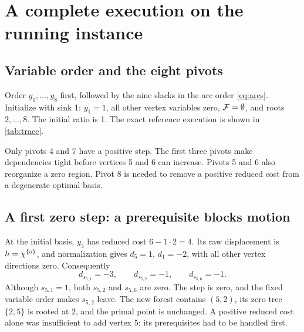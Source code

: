 \section{A complete execution on the running instance}\label{sec:trace}

\subsection{Variable order and the eight pivots}
Order $y_1,\ldots,y_8$ first, followed by the nine slacks in the arc order
\eqref{eq:arcs}. Initialize with sink 1: $y_1=1$, all other vertex variables
zero, $\mathcal F=\emptyset$, and roots $2,\ldots,8$. The initial ratio is 1.
The exact reference execution is shown in \cref{tab:trace}.

\begin{table}[htbp]
\renewcommand{\arraystretch}{1.4}
\centering
\caption{Complete Bland-rule trace for the first ratio oracle. Each row is
checked against a separately assembled rational basis system.}\label{tab:trace}
\end{table}

Only pivots 4 and 7 have a positive step. The first three pivots make
dependencies tight before vertices 5 and 6 can increase. Pivots 5 and 6
also reorganize a zero region. Pivot 8 is needed to remove a positive
reduced cost from a degenerate optimal basis.

\subsection{A first zero step: a prerequisite blocks motion}
At the initial basis, $y_5$ has reduced cost $6-1\cdot2=4$.
Its raw displacement is $h=\chi^{\{5\}}$, and normalization gives
$d_5=1$, $d_1=-2$, with all other vertex directions zero. Consequently
\[
 d_{s_{5,1}}=-3,\qquad d_{s_{5,2}}=-1,\qquad d_{s_{5,6}}=-1.
\]
Although $s_{5,1}=1$, both $s_{5,2}$ and $s_{5,6}$ are zero. The step is
zero, and the fixed variable order makes $s_{5,2}$ leave. The new forest
contains $(5,2)$, its zero tree $\{2,5\}$ is rooted at 2, and the primal
point is unchanged. A positive reduced cost alone was insufficient to add
vertex 5: its prerequisites had to be handled first.

